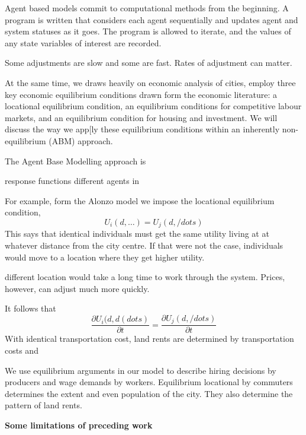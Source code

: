 Agent based models commit to computational methods from the beginning.  A program is written that considers each agent sequentially and updates agent and system statuses as it goes. The program is  allowed to iterate, and the values of any state variables of interest are recorded. 



Some adjustments are slow and some are fast. Rates of adjustment can matter. 



At the same time, we draws heavily on economic analysis of cities, employ three key economic equilibrium conditions drawn form the economic literature:  a locational equilibrium condition, an equilibrium conditions for competitive labour markets, and an equilibrium condition for housing and investment. We will discuss the way we app[ly  these equilibrium conditions within an inherently non-equilibrium (ABM) approach.

    



The Agent Base Modelling approach is 

response functions
different agents in 

For example, form the Alonzo model we impose the locational equilibrium condition,
\[U_i(d,\dots)=U_j(d, /dots)\]
This says that identical individuals must get the same utility living at at whatever distance from the city centre. If that were not the case, individuals would move to a location where they get higher utility.

different location would take a long time to work through the system. Prices, however, can adjust much more quickly. 

 It follows that 
\[\frac{\partial U_i(d, d(dots)}{\partial t}=\frac{\partial U_j(d, /dots)}{\partial t}\]
With identical transportation cost, 
land rents are determined by transportation costs  and  

We use  equilibrium arguments in our model to describe hiring decisions by producers and wage demands by workers. Equilibrium locational by commuters determines the extent and even population of the city. They also determine the pattern of land rents. 



\textbf{Some limitations of preceding work}%


